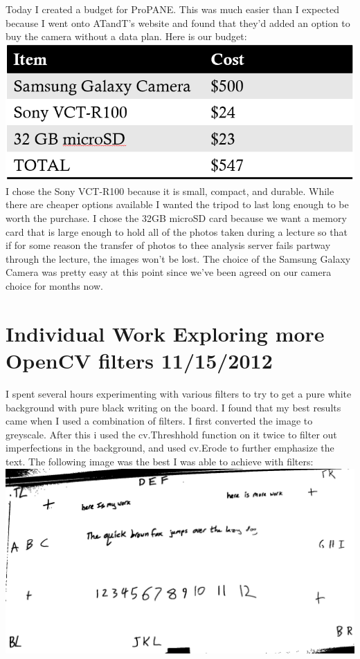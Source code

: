 \documentclass[]{article}
\begin{document}
	Today I created a budget for ProPANE. This was much easier than I expected because I went onto ATandT's website and found that they'd added an option to buy the camera without a data plan. Here is our budget: \\
	
		\includegraphics[scale=0.5]{images/budget.png} \\
		
		I chose the Sony VCT-R100 because it is small, compact, and durable. While there are cheaper options available I wanted the tripod to last long enough to be worth the purchase.
		I chose the 32GB microSD card because we want a memory card that is large enough to hold all of the photos taken during a lecture so that if for some reason the transfer of photos to thee analysis server fails partway through the lecture, the images won't be lost.
		The choice of the Samsung Galaxy Camera was pretty easy at this point since we've been agreed on our camera choice for months now.
	
	\section{Individual Work Exploring more OpenCV filters 11/15/2012}	
	
	I spent several hours experimenting with various filters to try to get a pure white background with pure black writing on the board. I found that my best results
	came when I used a combination of filters. I first converted the image to greyscale. After this i used the cv.Threshhold function on it twice to filter out imperfections in the background, and used cv.Erode to further emphasize the text. The following image was the best I was able to achieve with filters: \\
	
		\includegraphics[scale=0.2]{images/bestResult.jpg} \\
	
\end{document}
